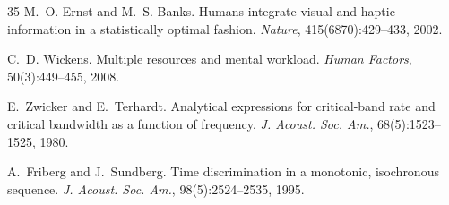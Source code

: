 \documentclass[sigchi, nonacm]{acmart}
\begin{document}
\begin{thebibliography}{35}
M.~O. Ernst and M.~S. Banks.
\newblock Humans integrate visual and haptic information in a statistically optimal fashion.
\newblock \emph{Nature}, 415(6870):429--433, 2002.

C.~D. Wickens.
\newblock Multiple resources and mental workload.
\newblock \emph{Human Factors}, 50(3):449--455, 2008.

E.~Zwicker and E.~Terhardt.
\newblock Analytical expressions for critical-band rate and critical bandwidth as a function of frequency.
\newblock \emph{J. Acoust. Soc. Am.}, 68(5):1523--1525, 1980.

A.~Friberg and J.~Sundberg.
\newblock Time discrimination in a monotonic, isochronous sequence.
\newblock \emph{J. Acoust. Soc. Am.}, 98(5):2524--2535, 1995.

\end{thebibliography}
\end{document}
